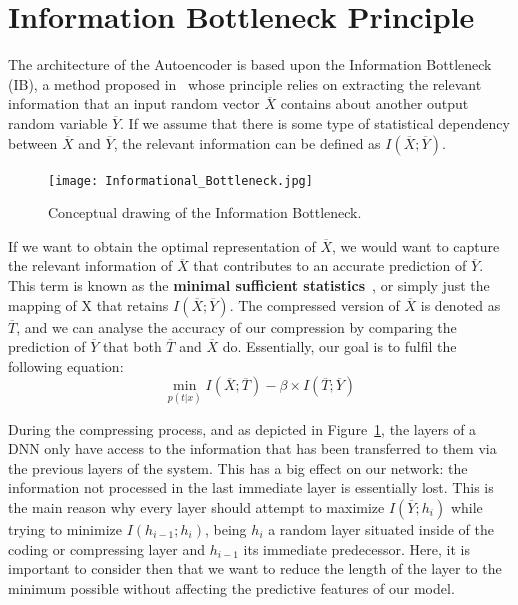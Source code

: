 \section{Information Bottleneck Principle}

The architecture of the Autoencoder is based upon the  Information Bottleneck (IB), a method proposed in~\cite{Inf_Bottleneck_first} whose principle relies on extracting the relevant information that an input random vector $\overline X$ contains about another output random variable $\overline Y$. If we assume that there is some type of statistical dependency between $\overline X$ and $\overline Y$, the relevant information can be defined as $I(\overline X;\overline Y)$.\par
%
\begin{figure}[H]
	\centering
	\texttt{[image: Informational\_Bottleneck.jpg]}
	\caption{Conceptual drawing of the Information Bottleneck.}
	\label{fig:figure_info_bottle}
\end{figure} 

If we want to obtain the optimal representation of $\overline X$, we would want to capture the relevant information of $\overline X$ that contributes to an accurate prediction of $\overline Y$. This term is known as the \textbf{minimal sufficient statistics}~\cite{Minimal_and_Autoencoder}, or simply just the mapping of X that retains $I(\overline X;\overline Y)$. The compressed version of $\overline X$ is denoted as $\overline T$, and we can analyse the accuracy of our compression by comparing the prediction of $\overline Y$ that both $\overline T$ and $\overline X$ do. Essentially, our goal is to fulfil the following equation: %
%
\begin{equation}
\label{eq:Bottleneck_equation}
\min\limits_{p(t|x)}  I(\overline X;\overline T) - \beta \times I(\overline T;\overline Y)
\end{equation} \newline

During the compressing process, and as depicted in Figure~\ref{fig:figure_info_bottle}, the layers of a DNN only have access to the information that has been transferred to them via the previous layers of the system. This has a big effect on our network: the information not processed in the last immediate layer is essentially lost. This is the main reason why every layer should attempt to maximize $I(\overline Y;h_i)$ while trying to minimize $I(h_{i-1};h_i)$, being $h_i$ a random layer situated inside of the coding or compressing layer and $h_{i-1}$ its immediate predecessor. Here, it is important to consider then that we want to reduce the length of the layer to the minimum possible without affecting the predictive features of our model. \par

